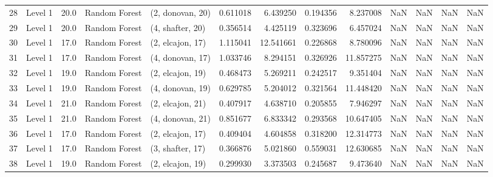 \begin{tabular}{llrllrrrrrrrr}
28 &   Level 1 &   20.0 &  Random Forest &  (2, donovan, 20) &   0.611018 &   6.439250 &  0.194356 &   8.237008 &                  NaN &                    NaN &                 NaN &                   NaN \\
29 &   Level 1 &   20.0 &  Random Forest &  (4, shafter, 20) &   0.356514 &   4.425119 &  0.323696 &   6.457024 &                  NaN &                    NaN &                 NaN &                   NaN \\
30 &   Level 1 &   17.0 &  Random Forest &  (2, elcajon, 17) &   1.115041 &  12.541661 &  0.226868 &   8.780096 &                  NaN &                    NaN &                 NaN &                   NaN \\
31 &   Level 1 &   17.0 &  Random Forest &  (4, donovan, 17) &   1.033746 &   8.294151 &  0.326926 &  11.857275 &                  NaN &                    NaN &                 NaN &                   NaN \\
32 &   Level 1 &   19.0 &  Random Forest &  (2, elcajon, 19) &   0.468473 &   5.269211 &  0.242517 &   9.351404 &                  NaN &                    NaN &                 NaN &                   NaN \\
33 &   Level 1 &   19.0 &  Random Forest &  (4, donovan, 19) &   0.629785 &   5.204012 &  0.321564 &  11.448420 &                  NaN &                    NaN &                 NaN &                   NaN \\
34 &   Level 1 &   21.0 &  Random Forest &  (2, elcajon, 21) &   0.407917 &   4.638710 &  0.205855 &   7.946297 &                  NaN &                    NaN &                 NaN &                   NaN \\
35 &   Level 1 &   21.0 &  Random Forest &  (4, donovan, 21) &   0.851677 &   6.833342 &  0.293568 &  10.647405 &                  NaN &                    NaN &                 NaN &                   NaN \\
36 &   Level 1 &   17.0 &  Random Forest &  (2, elcajon, 17) &   0.409404 &   4.604858 &  0.318200 &  12.314773 &                  NaN &                    NaN &                 NaN &                   NaN \\
37 &   Level 1 &   17.0 &  Random Forest &  (3, shafter, 17) &   0.366876 &   5.021860 &  0.559031 &  12.630685 &                  NaN &                    NaN &                 NaN &                   NaN \\
38 &   Level 1 &   19.0 &  Random Forest &  (2, elcajon, 19) &   0.299930 &   3.373503 &  0.245687 &   9.473640 &                  NaN &                    NaN &                 NaN &                   NaN \\

\end{tabular}
